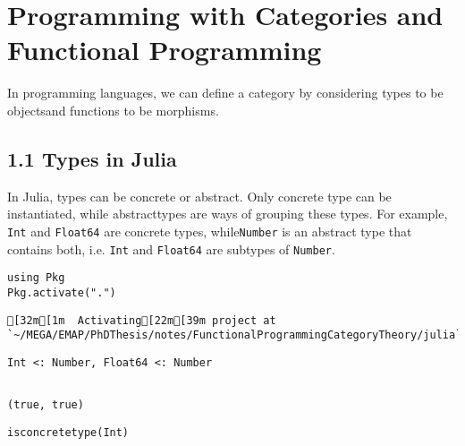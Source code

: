 \newpage

\chapter{Programming with Categories and Functional Programming}
In programming languages, we can define a category by considering types to be objectsand functions to be morphisms.


\section{1.1 Types in Julia}
In Julia, types can be concrete or abstract. Only concrete type can be instantiated, while abstracttypes are ways of grouping these types. For example, \lstinline[style=julia]{Int} and \lstinline[style=julia]{Float64} are concrete types, while\lstinline[style=julia]{Number} is an abstract type that contains both, i.e. \lstinline[style=julia]{Int} and \lstinline[style=julia]{Float64} are subtypes of \lstinline[style=julia]{Number}.
\bigskip
\begin{lstlisting}[language=JuliaLocal, style=julia, texcl=true]
using Pkg
Pkg.activate(".")
\end{lstlisting}

\begingroup

\fontsize{10pt}{12pt}\selectfont

\begin{verbatim}
[32m[1m  Activating[22m[39m project at `~/MEGA/EMAP/PhDThesis/notes/FunctionalProgrammingCategoryTheory/julia`

\end{verbatim}

\endgroup

\bigskip
\begin{lstlisting}[language=JuliaLocal, style=julia, texcl=true]
Int <: Number, Float64 <: Number
\end{lstlisting}

\begingroup

\fontsize{10pt}{12pt}\selectfont

\begin{verbatim}

(true, true)
\end{verbatim}

\endgroup

\bigskip
\begin{lstlisting}[language=JuliaLocal, style=julia, texcl=true]
isconcretetype(Int)
\end{lstlisting}

